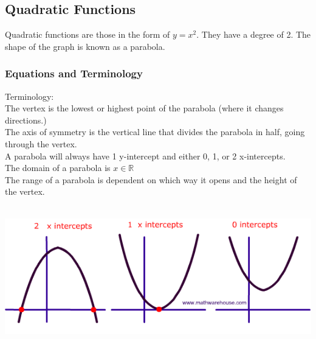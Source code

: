 \subsection{Quadratic Functions}
Quadratic functions are those in the form of $y=x^2$. They have a degree of 2. The shape of the graph is known as a parabola.

\subsubsection{Equations and Terminology}
Terminology:\\
The vertex is the lowest or highest point of the parabola (where it changes directions.)\\
The axis of symmetry is the vertical line that divides the parabola in half, going through the vertex.\\
A parabola will always have 1 y-intercept and either 0, 1, or 2 x-intercepts.\\
The domain of a parabola is $x\in\mathbb{R}$\\
The range of a parabola is dependent on which way it opens and the height of the vertex.\\
\\
\centerline{\includegraphics[scale = 0.6]{PreCalcPictures/ParabolaSolutions.png}}

